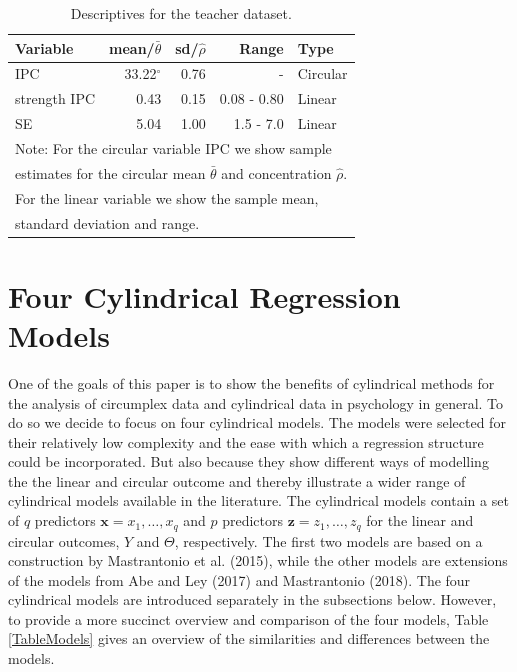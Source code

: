 \documentclass[man]{apa6}
\theoremstyle{definition}
\theoremstyle{definition}
\theoremstyle{definition}
\theoremstyle{remark}
\begin{document}
\begin{table}[h]
\centering
\caption{Descriptives for the teacher dataset.} 
\begin{tabular}{lrrrl}
  \noalign{\smallskip}\hline\noalign{\smallskip}
Variable & mean/$\bar{\theta}$ & sd/$\hat{\rho}$ & Range & Type \\ \hline\noalign{\smallskip}
IPC &33.22$^\circ$& 0.76 & - & Circular\\
strength IPC & 0.43 & 0.15 & 0.08 - 0.80 & Linear\\
SE & 5.04 & 1.00 & 1.5 - 7.0 & Linear\\
   \hline
\multicolumn{5}{l}{Note: For the circular variable IPC we show sample }\\
\multicolumn{5}{l}{estimates for the circular mean $\bar{\theta}$ and concentration $\hat{\rho}$.}\\
\multicolumn{5}{l}{For the linear variable we show the sample mean,}\\
\multicolumn{5}{l}{standard deviation and range.}
\end{tabular}
\label{Tableteacherdescriptives}
\end{table}

\section{Four Cylindrical Regression Models}\label{Models}

One of the goals of this paper is to show the benefits of cylindrical
methods for the analysis of circumplex data and cylindrical data in
psychology in general. To do so we decide to focus on four cylindrical
models. The models were selected for their relatively low complexity and
the ease with which a regression structure could be incorporated. But
also because they show different ways of modelling the the linear and
circular outcome and thereby illustrate a wider range of cylindrical
models available in the literature. The cylindrical models contain a set
of \(q\) predictors \(\boldsymbol{x} = x_1, \dots, x_q\) and \(p\)
predictors \(\boldsymbol{z} = z_1, \dots, z_q\) for the linear and
circular outcomes, \(Y\) and \(\Theta\), respectively. The first two
models are based on a construction by Mastrantonio et al. (2015), while
the other models are extensions of the models from Abe and Ley (2017)
and Mastrantonio (2018). The four cylindrical models are introduced
separately in the subsections below. However, to provide a more succinct
overview and comparison of the four models, Table \ref{TableModels}
gives an overview of the similarities and differences between the
models.
\end{document}
